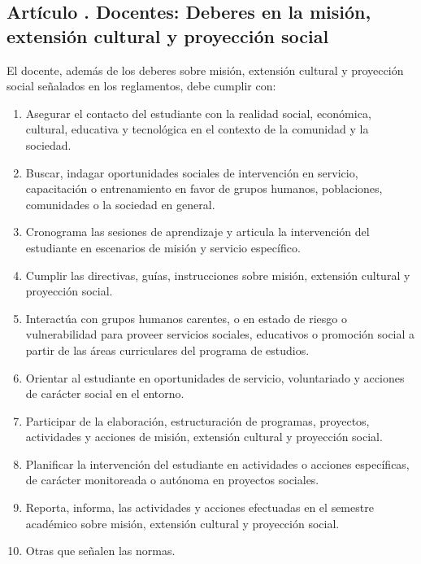 \subsection{Artículo . Docentes: Deberes en la misión, extensión cultural y proyección social}
\addtocounter{ns}{1}
El docente, además de los deberes sobre misión, extensión cultural y proyección social señalados en los reglamentos, debe cumplir con: 
\begin{enumerate}
\item Asegurar el contacto del estudiante con la realidad social, económica, cultural, educativa y tecnológica en el contexto de la comunidad y la sociedad. 
\item Buscar, indagar oportunidades sociales de intervención en servicio, capacitación o entrenamiento en favor de grupos humanos, poblaciones, comunidades o la sociedad en general. 
\item Cronograma las sesiones de aprendizaje y articula la intervención del estudiante en escenarios de misión y servicio específico.  
\item Cumplir las directivas, guías, instrucciones sobre misión, extensión cultural y proyección social. 
\item Interactúa con grupos humanos carentes, o en estado de riesgo o vulnerabilidad para proveer servicios sociales, educativos o promoción social a partir de las áreas curriculares del programa de estudios. 
\item Orientar al estudiante en oportunidades de servicio, voluntariado y acciones de carácter social en el entorno. 
\item Participar de la elaboración, estructuración de programas, proyectos, actividades y acciones de misión, extensión cultural y proyección social. 
\item Planificar la intervención del estudiante en actividades o acciones específicas, de carácter monitoreada o autónoma en proyectos sociales. 
\item Reporta, informa, las actividades y acciones efectuadas en el semestre académico sobre misión, extensión cultural y proyección social. 
\item Otras que señalen las normas. 
\end{enumerate}
